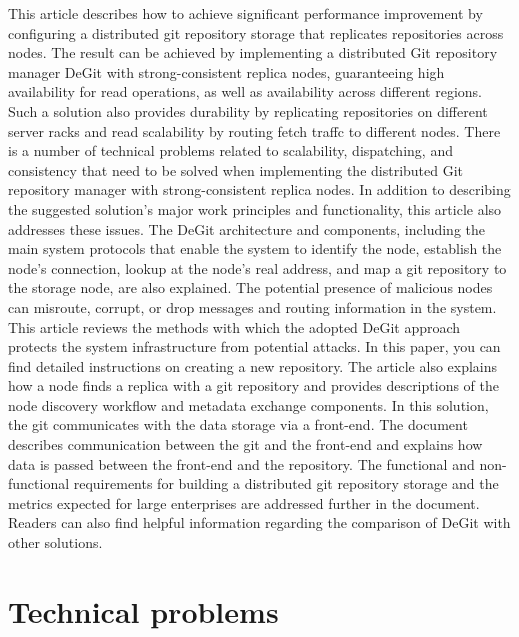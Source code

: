 \documentclass[acmlarge, screen, nonacm, 11pt]{acmart}
\begin{document}
This article describes how to achieve significant performance improvement
by configuring a distributed git repository storage that replicates
repositories across nodes. The result can be achieved by implementing
a distributed Git repository manager DeGit with strong-consistent replica
nodes, guaranteeing high availability for read operations,
as well as availability across different regions.
Such a solution also provides durability by replicating repositories
on different server racks and read scalability by routing fetch traffc
to different nodes.
There is a number of technical problems related to scalability,
dispatching, and consistency that need to be solved when implementing
the distributed Git repository manager with strong-consistent replica nodes.
In addition to describing the suggested solution's major work principles
and functionality, this article also addresses these issues.
The DeGit architecture and components, including the main system protocols
that enable the system to identify the node, establish the node's connection,
lookup at the node’s real address, and map a git repository to the
storage node, are also explained.
The potential presence of malicious nodes can misroute, corrupt,
or drop messages and routing information in the system.
This article reviews the methods with which the adopted DeGit approach
protects the system infrastructure from potential attacks.
In this paper, you can find detailed instructions on creating a new repository.
The article also explains how a node finds a replica with a git repository
and provides descriptions of the node discovery workflow and metadata
exchange components.
In this solution, the git communicates with the data storage via a front-end.
The document describes communication between the git and the front-end
and explains how data is passed between the front-end and the repository.
The functional and non-functional requirements for building a distributed
git repository storage and the metrics expected for large enterprises
are addressed further in the document. Readers can also find helpful
information regarding the comparison of DeGit with other solutions.

\section{Technical problems}\label{sec:technical-problems}
\end{document}
